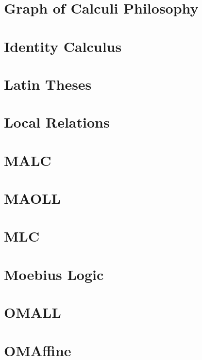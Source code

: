 \documentclass{report}
\begin{document}
\chapter{Graph of Calculi Philosophy}

\chapter{Identity Calculus}

\chapter{Latin Theses}

\chapter{Local Relations}

\chapter{MALC}

\chapter{MAOLL}

\chapter{MLC}

\chapter{Moebius Logic}

\chapter{OMALL}

\chapter{OMAffine}
\end{document}
